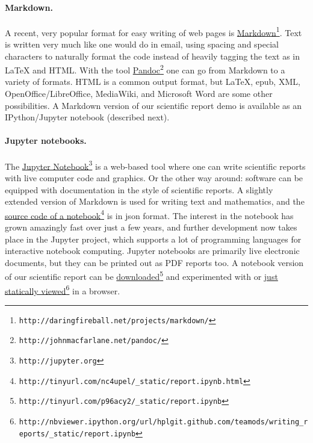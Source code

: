\documentclass[graybox,sectrefs,envcountresetchap,open=right,final]{svmonodo}
\begin{document}
\paragraph{Markdown.}
A recent, very popular format for easy writing of web pages is
\href{{http://daringfireball.net/projects/markdown/}}{Markdown}\footnote{\texttt{http://daringfireball.net/projects/markdown/}}.
Text is written very much like one would do in email, using
spacing and special characters to naturally format the code
instead of heavily tagging the text as in {\LaTeX} and HTML.
With the tool \href{{http://johnmacfarlane.net/pandoc/}}{Pandoc}\footnote{\texttt{http://johnmacfarlane.net/pandoc/}} one
can go from Markdown to a variety of formats.
HTML is a common output format, but {\LaTeX}, epub, XML,
OpenOffice/LibreOffice, MediaWiki, and Microsoft Word are some other
possibilities. A Markdown version of our scientific
report demo is available as an IPython/Jupyter notebook (described next).


\paragraph{Jupyter notebooks.}
The \href{{http://jupyter.org}}{Jupyter Notebook}\footnote{\texttt{http://jupyter.org}} is
a web-based tool where one can write scientific reports with live computer
code and graphics. Or the other way around: software can be equipped
with documentation in the style of scientific reports.
A slightly extended version of Markdown is used for writing text and
mathematics, and the \href{{http://tinyurl.com/nc4upel/_static/report.ipynb.html}}{source code of a notebook}\footnote{\texttt{http://tinyurl.com/nc4upel/\_static/report.ipynb.html}} is in json format.
The interest in the notebook has grown amazingly fast
over just a few years, and further development now takes place
in the Jupyter project, which
supports a lot of programming languages for interactive notebook computing.
Jupyter notebooks are primarily live electronic documents, but they can be
printed out as PDF reports too.
A notebook version of our scientific report can be \href{{http://tinyurl.com/p96acy2/_static/report.ipynb}}{downloaded}\footnote{\texttt{http://tinyurl.com/p96acy2/\_static/report.ipynb}} and experimented with
or \href{{http://nbviewer.ipython.org/url/hplgit.github.com/teamods/writing_reports/_static/report.ipynb}}{just statically viewed}\footnote{\texttt{http://nbviewer.ipython.org/url/hplgit.github.com/teamods/writing\_reports/\_static/report.ipynb}} in a browser.
\end{document}
